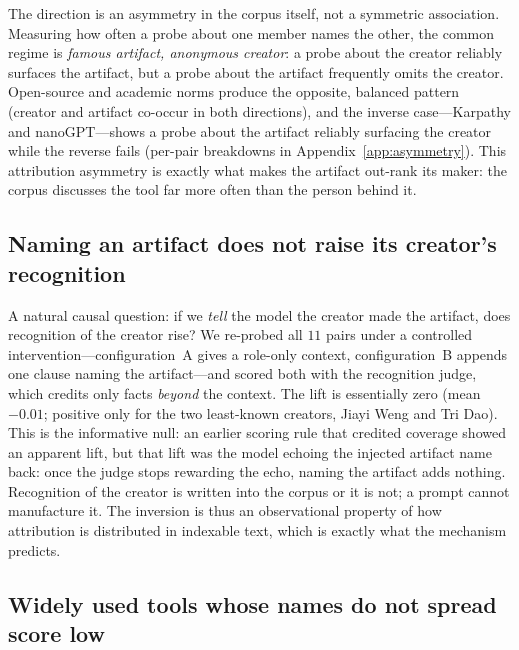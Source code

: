 \documentclass[11pt]{article}
\begin{document}
The direction is an asymmetry in the corpus itself, not a symmetric association. Measuring how often a probe about one member names the other, the common regime is \emph{famous artifact, anonymous creator}: a probe about the creator reliably surfaces the artifact, but a probe about the artifact frequently omits the creator. Open-source and academic norms produce the opposite, balanced pattern (creator and artifact co-occur in both directions), and the inverse case---Karpathy and nanoGPT---shows a probe about the artifact reliably surfacing the creator while the reverse fails (per-pair breakdowns in Appendix~\ref{app:asymmetry}). This attribution asymmetry is exactly what makes the artifact out-rank its maker: the corpus discusses the tool far more often than the person behind it.

\subsection{Naming an artifact does not raise its creator's recognition}
\label{sec:results-mediation-causal}

A natural causal question: if we \emph{tell} the model the creator made the artifact, does recognition of the creator rise? We re-probed all $11$ pairs under a controlled intervention---configuration~A gives a role-only context, configuration~B appends one clause naming the artifact---and scored both with the recognition judge, which credits only facts \emph{beyond} the context. The lift is essentially zero (mean $-0.01$; positive only for the two least-known creators, Jiayi Weng and Tri Dao). This is the informative null: an earlier scoring rule that credited coverage showed an apparent lift, but that lift was the model echoing the injected artifact name back: once the judge stops rewarding the echo, naming the artifact adds nothing. Recognition of the creator is written into the corpus or it is not; a prompt cannot manufacture it. The inversion is thus an observational property of how attribution is distributed in indexable text, which is exactly what the mechanism predicts.

\subsection{Widely used tools whose names do not spread score low}
\label{sec:results-cases}
\end{document}
